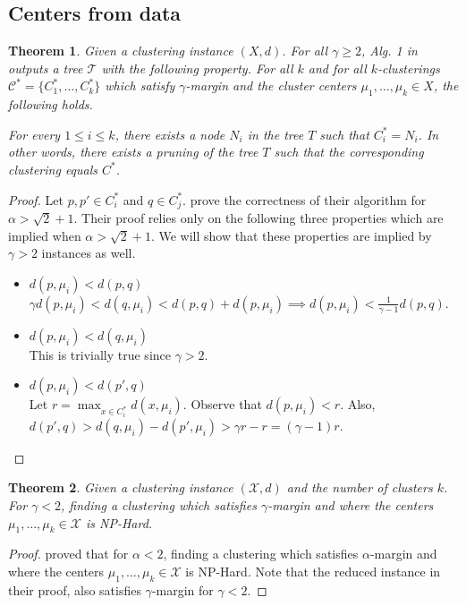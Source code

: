 \documentclass{article}
\newcommand{\mc}{\mathcal}
\newtheorem{theorem}{Theorem}
\begin{document}
\subsection{Centers from data}
\begin{theorem}
\label{thm:upperCenterData}
Given a clustering instance $(X , d)$. For all $\gamma \ge 2$, Alg. 1 in \cite{balcan2012clustering} outputs a tree $\mc T$ with the following property. For all $k$ and for all $k$-clusterings $\mc C^* = \{C_1^*, \ldots, C_k^* \}$ which satisfy $\gamma$-margin and the cluster centers $\mu_1, \ldots, \mu_k \in X$, the following holds.

For every $1 \le i \le k$, there exists a node $N_i$ in the tree $T$ such that $C_i^* = N_i$. In other words, there exists a pruning of the tree $T$ such that the corresponding clustering equals $C^*$. 
\end{theorem}

\begin{proof}
Let $p, p' \in C_i^*$ and $q \in C_j^*$. \cite{balcan2012clustering} prove the correctness of their algorithm for $\alpha > \sqrt{2} + 1$. Their proof relies only on the following three properties which are implied when $\alpha > \sqrt{2} + 1$. We will show that these properties are implied by $\gamma > 2$ instances as well.
\begin{itemize}[nolistsep,noitemsep]
\item $d(p, \mu_i) < d(p, q)$\\
$\gamma d(p, \mu_i) < d(q, \mu_i) < d(p, q) + d(p, \mu_i) \implies d(p, \mu_i) < \frac{1}{\gamma-1}d(p, q)$.
\item $d(p, \mu_i) < d(q, \mu_i)$\\
This is trivially true since $\gamma > 2$.
\item $d(p, \mu_i) < d(p', q)$\\
Let $r = \max_{x \in C_i^*} d(x, \mu_i)$. Observe that $d(p, \mu_i) < r$. Also, $d(p', q)> d(q, \mu_i)-d(p', \mu_i) > \gamma r - r = (\gamma -1)r$.
\end{itemize}
\end{proof}

\begin{theorem}
\label{thm:lowerCenterData}
Given a clustering instance $(\mc X, d)$ and the number of clusters $k$. For $\gamma < 2$, finding a clustering which satisfies $\gamma$-margin and where the centers $\mu_1, \ldots, \mu_k \in \mc X$ is NP-Hard.
\end{theorem}
\begin{proof}
\cite{ben2014data} proved that for $\alpha < 2$, finding a clustering which satisfies $\alpha$-margin and where the centers $\mu_1, \ldots, \mu_k \in \mc X$ is NP-Hard. Note that the reduced instance in their proof, also satisfies $\gamma$-margin for $\gamma < 2$. 
\end{proof}
\end{document}
